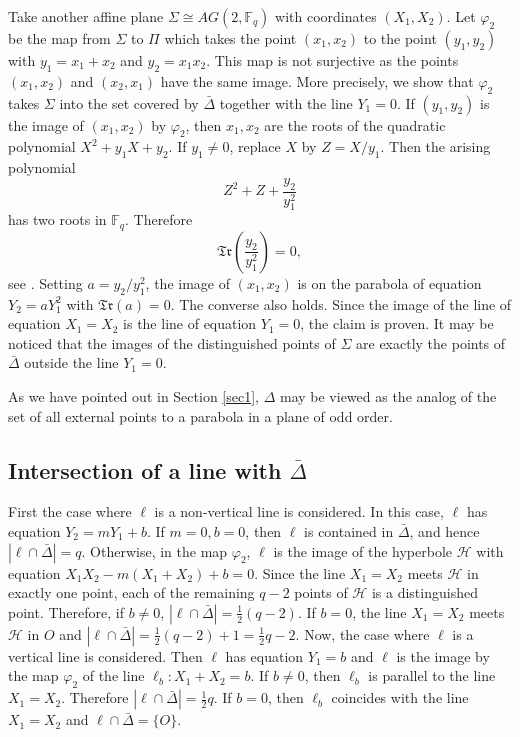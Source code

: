 \documentclass[sn-mathphys-num]{sn-jnl}%
\begin{document}
Take another affine plane $\Sigma\cong AG(2,\mathbb{F}_q)$ with coordinates $(X_1,X_2)$. Let $\varphi_2$ be the map from $\Sigma$ to $\Pi$ which takes the point $(x_1,x_2)$ to the point $(y_1,y_2)$ with $y_1=x_1+x_2$ and $y_2=x_1x_2$. This map is not surjective as the points $(x_1,x_2)$ and $(x_2,x_1)$ have the same image. More precisely, we show that $\varphi_2$ takes $\Sigma$ into the set covered by $\bar{\Delta}$ together with the line $Y_1=0$. If $(y_1,y_2)$ is the image of $(x_1,x_2)$ by $\varphi_2$, then
$x_1,x_2$ are the roots of the quadratic polynomial $X^2+y_1X+y_2$. If $y_1\ne 0$, replace $X$ by $Z=X/y_1$. Then the arising polynomial
$$Z^2+Z+\frac{y_2}{y_1^2}$$
has two roots in $\mathbb{F}_q$. Therefore $$\mathfrak{Tr}\left(\frac{y_2}{y_1^2}\right)=0,$$
see \cite[Section 1.4]{HJWP}.
Setting $a=y_2/y_1^2$, the image of $(x_1,x_2)$ is on the parabola of equation $Y_2=aY_1^2$ with $\mathfrak{Tr}(a)=0$.
The converse also holds. Since the image of the line of equation $X_1=X_2$ is the line of equation $Y_1=0$, the claim is proven. It may be noticed that the images of the distinguished points of $\Sigma$ are exactly the points of $\bar{\Delta}$ outside the line $Y_1=0$.

As we have  pointed out in Section \ref{sec1}, $\Delta$ may be viewed as the analog of the set of all external points to a parabola in a plane of odd order.
\subsection{Intersection of a line with $\bar{\Delta}$}
\label{linesec}
First the case where $\ell$ is a non-vertical line is considered. In this case, $\ell$ has equation $Y_2=mY_1+b$. If $m=0,b=0$, then $\ell$ is contained in $\bar{\Delta}$, and hence $|\ell\cap \bar{\Delta}|=q$. Otherwise, in the map $\varphi_2$, $\ell$ is the image of the hyperbole $\mathcal{H}$ with equation $X_1X_2-m(X_1+X_2)+b=0$. Since the line $X_1=X_2$ meets $\mathcal{H}$ in exactly one point, each of the remaining $q-2$ points of $\mathcal{H}$ is a distinguished point. Therefore, if $b\ne0$, $|\ell\cap \bar{\Delta}|=\frac{1}{2} (q-2)$. If $b=0$, the line $X_1=X_2$ meets $\mathcal{H}$ in $O$ and $|\ell\cap\bar{\Delta}|=\frac{1}{2}(q-2)+1=\frac{1}{2}q-2$. Now, the case where $\ell$ is a vertical line is considered. Then $\ell$ has equation $Y_1=b$ and $\ell$ is the image by the map $\varphi_2$ of the line $\ell_b: X_1+X_2=b$. If $b\neq0$, then $\ell_b$ is parallel to the line $X_1=X_2$. Therefore $|\ell\cap\bar{\Delta}|=\frac{1}{2}q$. If $b=0$, then $\ell_b$ coincides with the line $X_1=X_2$ and $\ell\cap\bar{\Delta}=\{O\}$.
\end{document}
